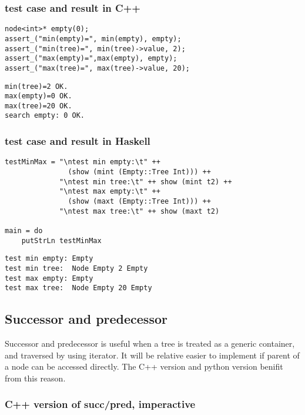 \documentclass{article}
\begin{document}
\subsubsection*{test case and result in C++}
\lstset{language=c++}
\begin{lstlisting}
node<int>* empty(0);
assert_("min(empty)=", min(empty), empty);
assert_("min(tree)=", min(tree)->value, 2);
assert_("max(empty)=",max(empty), empty);
assert_("max(tree)=", max(tree)->value, 20);
\end{lstlisting}

\begin{verbatim}
min(tree)=2 OK.
max(empty)=0 OK.
max(tree)=20 OK.
search empty: 0 OK.
\end{verbatim}

\subsubsection*{test case and result in Haskell}

\lstset{language=Haskell}
\begin{lstlisting}
testMinMax = "\ntest min empty:\t" ++ 
               (show (mint (Empty::Tree Int))) ++
             "\ntest min tree:\t" ++ show (mint t2) ++ 
             "\ntest max empty:\t" ++ 
               (show (maxt (Empty::Tree Int))) ++
             "\ntest max tree:\t" ++ show (maxt t2)

main = do
    putStrLn testMinMax
\end{lstlisting}

\begin{verbatim}
test min empty: Empty
test min tree:  Node Empty 2 Empty
test max empty: Empty
test max tree:  Node Empty 20 Empty
\end{verbatim}

\subsection{Successor and predecessor}

Successor and predecessor is useful when a tree is treated as a generic container,
and traversed by using iterator. It will be relative easier to implement if parent of
a node can be accessed directly. The C++ version and python version benifit from
this reason.

\subsubsection*{C++ version of succ/pred, imperactive}
\end{document}
